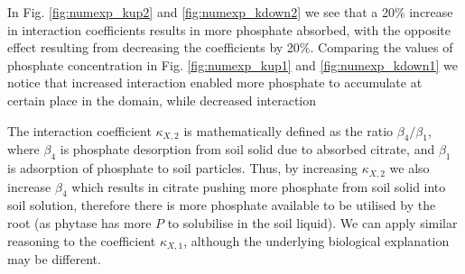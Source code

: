 \documentclass[11pt]{article}
\numberwithin{equation}{section}
\begin{document}
In Fig. \ref{fig:numexp_kup2} and \ref{fig:numexp_kdown2} we see that a 20\% increase in interaction coefficients results in more phosphate absorbed, with the opposite effect resulting from decreasing the coefficients by 20\%. Comparing the values of phosphate concentration in Fig. \ref{fig:numexp_kup1} and \ref{fig:numexp_kdown1} we notice that increased interaction enabled more phosphate to accumulate at certain place in the domain, while decreased interaction 

The interaction coefficient $\kappa_{X,2}$ is mathematically defined as the ratio $\beta_4 / \beta_1$, where $\beta_4$ is phosphate desorption from soil solid due to absorbed citrate, and $\beta_1$ is adsorption of phosphate to soil particles. Thus, by increasing $\kappa_{X,2}$ we also increase $\beta_4$ which results in citrate pushing more phosphate from soil solid into soil solution, therefore there is more phosphate available to be utilised by the root (as phytase has more $P$ to solubilise in the soil liquid). We can apply similar reasoning to the coefficient $\kappa_{X,1}$, although the underlying biological explanation may be different. 
\end{document}
